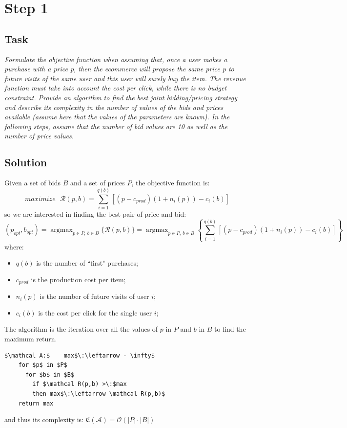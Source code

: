 \documentclass[12pt,a4paper]{report}
\DeclareMathOperator*{\argmax}{argmax}
\begin{document}
		\section{Step 1}
			\subsection{Task}
\textit{Formulate the objective function when assuming that, once a user makes a purchase with a price p, then the ecommerce will propose the same price p to future visits of the same user and this user will surely buy the item. The revenue function must take into account the cost per click, while there is no budget constraint. Provide an algorithm to find the best joint bidding/pricing strategy and describe its complexity in the number of values of the bids and prices available (assume here that the values of the parameters are known). In the following steps, assume that the number of bid values are 10 as well as the number of price values.}
			\subsection{Solution}
Given a set of bids $B$ and a set of prices $P$, the  objective function is:
\[ maximize \: \: \: \mathcal R(p,b) =  \sum_{i=1}^{q(b)}{[(p - c_{prod})(1+n_i(p)) - c_i(b)]}\]
so we are interested in finding the best pair of price and bid:
\[ (p_{opt}, b_{opt}) = \argmax_{p \in P,\: b \in B}\{ \mathcal R(p,b)\} = \argmax_{p \in P,\: b \in B}\left\{ \sum_{i=1}^{q(b)}{[(p - c_{prod})(1+n_i(p)) - c_i(b)]}  \right\}\]
where:
\begin{itemize}
	\item $q(b)$ is the number of ``first" purchases;

	\item $c_{prod}$ is the production cost per item;
	\item $n_i(p)$ is the number of future visits of user $i$;
	\item $c_i(b)$ is the cost per click for the single user $i$; 
\end{itemize}

The algorithm is the iteration over all the values of $p$ in $P$ and $b$ in $B$ to find the maximum return.

\begin{lstlisting}[mathescape=true]
    $\mathcal A:$    max$\:\leftarrow - \infty$
	for $p$ in $P$
	  for $b$ in $B$
	    if $\mathcal R(p,b) >\:$max 
	    then max$\:\leftarrow \mathcal R(p,b)$
	return max
\end{lstlisting}
and thus its complexity is: $\mathfrak C(\mathcal A) = \mathcal O(|P|\cdot |B|)$
\end{document}
